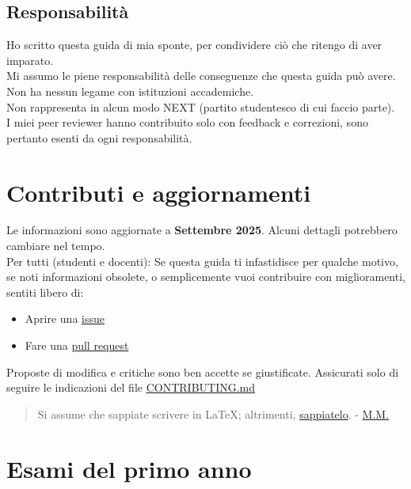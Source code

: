 \documentclass[18pt]{extarticle}
\begin{document}
\subsection{Responsabilità}
Ho scritto questa guida di mia sponte, per condividere ciò che ritengo di aver imparato.\\
Mi assumo le piene responsabilità delle conseguenze che questa guida può avere.\\
Non ha nessun legame con istituzioni accademiche.\\
Non rappresenta in alcun modo NEXT (partito studentesco di cui faccio parte).\\
I miei peer reviewer hanno contribuito solo con feedback e correzioni, sono pertanto esenti da ogni responsabilità.\\

\section{Contributi e aggiornamenti}
Le informazioni sono aggiornate a \textbf{Settembre 2025}. Alcuni dettagli potrebbero cambiare nel tempo.\\
Per tutti (studenti e docenti): Se questa guida ti infastidisce per qualche motivo, se noti informazioni obsolete, o semplicemente vuoi contribuire con miglioramenti, sentiti libero di:
\begin{itemize}
    \item Aprire una \href{https://github.com/Verryx-02/Scuola-di-sopravvivenza-per-studenti-di-Informatica/issues}{issue}
    \item Fare una \href{https://github.com/Verryx-02/Scuola-di-sopravvivenza-per-studenti-di-Informatica/pulls}{pull request}
\end{itemize}
Proposte di modifica e critiche sono ben accette se giustificate. Assicurati solo di seguire le indicazioni del file \href{https://github.com/Verryx-02/Scuola-di-sopravvivenza-per-studenti-di-Informatica/blob/main/CONTRIBUTING.md}{CONTRIBUTING.md}
\begin{quote}
Si assume che sappiate scrivere in \LaTeX; altrimenti, \href{https://www.learnlatex.org/it/}{sappiatelo}. - \href{https://github.com/miculan}{M.M.}
\end{quote}

\clearpage
\section{Esami del primo anno}
\end{document}
